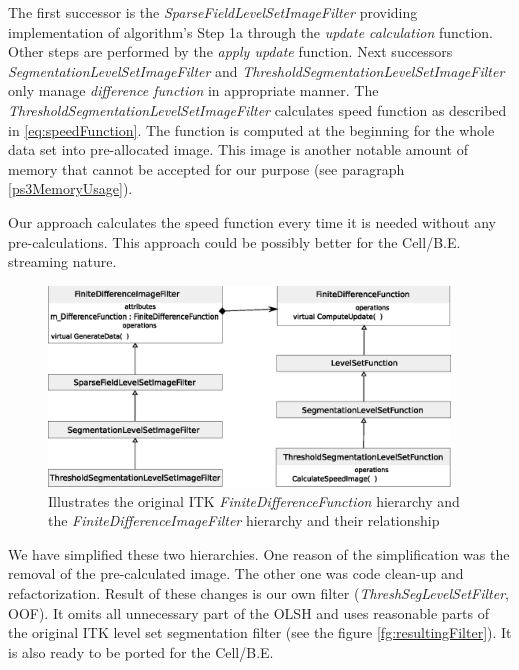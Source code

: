\par
The first successor is the \mbox{\emph{SparseFieldLevelSetImageFilter}} providing implementation of algorithm's Step 1a through the \emph{update calculation} function.
Other steps are performed by the \emph{apply update} function.
Next successors \mbox{\emph{SegmentationLevelSetImageFilter}} and \mbox{\emph{ThresholdSegmentationLevelSetImageFilter}} only manage \emph{difference function} in appropriate manner.
The \mbox{\emph{ThresholdSegmentationLevelSetImageFilter}} calculates speed function as described in \ref{eq:speedFunction}.
The function is computed at the beginning for the whole data set into pre-allocated image.
This image is another notable amount of memory that cannot be accepted for our purpose (see paragraph \ref{ps3MemoryUsage}).

\par
Our approach calculates the speed function every time it is needed without any pre-calculations.
This approach could be possibly better for the \mbox{Cell/B.E.} streaming nature.

\begin{figure}
    \centering
    \includegraphics[width=0.95\textwidth]{data/originalHierarchy}
    \caption[Original ITK thresholding level set filter class hierarchy]
{Illustrates the original ITK \mbox{\emph{FiniteDifferenceFunction}} hierarchy and the \mbox{\emph{FiniteDifferenceImageFilter}} hierarchy and their relationship}
    \label{fg:originalHierarchy}
\end{figure}

\par
We have simplified these two hierarchies.
One reason of the simplification was the removal of the pre-calculated image.
The other one was code clean-up and refactorization.
Result of these changes is our own filter (\mbox{\emph{ThreshSegLevelSetFilter}}, OOF).
It omits all unnecessary part of the OLSH and uses reasonable parts of the original ITK level set segmentation filter (see the figure \ref{fg:resultingFilter}).
It is also ready to be ported for the \mbox{Cell/B.E.}

